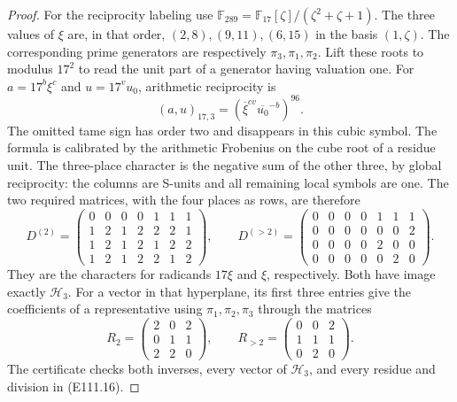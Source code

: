 \begin{proof}
For the reciprocity labeling use
$\mathbb F_{289}=\mathbb F_{17}[\zeta]/(\zeta^2+\zeta+1)$.
The three values of $\xi$ are, in that order,
$(2,8),(9,11),(6,15)$ in the basis $(1,\zeta)$.
The corresponding prime generators are respectively
$\pi_3,\pi_1,\pi_2$.
Lift these roots to modulus $17^2$ to read the unit part
of a generator having valuation one. For
$a=17^b\xi^c$ and $u=17^v u_0$, arithmetic reciprocity is
\[
        (a,u)_{17,3}
          =\left(\overline{\xi}^{cv}
                                \overline{u_0}^{-b}\right)^{96}.
 \tag{E111.16}
\]
The omitted tame sign has order two and disappears in
this cubic symbol. The formula is calibrated by the
arithmetic Frobenius on the cube root of a residue unit.
The three-place character is the negative sum of the
other three, by global reciprocity: the columns are
S-units and all remaining local symbols are one.
The two required matrices, with the four places as rows,
are therefore
\[
 D^{(2)}=
 \begin{pmatrix}
 0&0&0&0&1&1&1\\
 1&2&1&2&2&2&1\\
 1&2&1&2&1&2&2\\
 1&2&1&2&2&1&2
 \end{pmatrix},\qquad
 D^{(>2)}=
 \begin{pmatrix}
 0&0&0&0&1&1&1\\
 0&0&0&0&0&0&2\\
 0&0&0&0&2&0&0\\
 0&0&0&0&0&2&0
 \end{pmatrix}.
 \tag{E111.17}
\]
They are the characters for radicands $17\xi$ and $\xi$,
respectively. Both have image exactly $\mathcal H_3$.
For a vector in that hyperplane, its first three entries
give the coefficients of a representative using
$\pi_1,\pi_2,\pi_3$ through the matrices
\[
 R_2=\begin{pmatrix}2&0&2\\0&1&1\\2&2&0\end{pmatrix},
 \qquad
 R_{>2}=\begin{pmatrix}0&0&2\\1&1&1\\0&2&0\end{pmatrix}.
 \tag{E111.18}
\]
The certificate checks both inverses, every vector of
$\mathcal H_3$, and every residue and division in (E111.16).


\end{proof}
